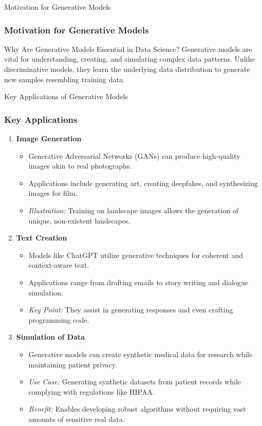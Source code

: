 \documentclass[aspectratio=169]{beamer}
\begin{document}
\begin{frame}{Motivation for Generative Models}
    \frametitle{Motivation for Generative Models}
    
    \begin{block}{Why Are Generative Models Essential in Data Science?}
        Generative models are vital for understanding, creating, and simulating complex data patterns. Unlike discriminative models, they learn the underlying data distribution to generate new samples resembling training data.
    \end{block}
\end{frame}

\begin{frame}{Key Applications of Generative Models}
    \frametitle{Key Applications}
    \begin{enumerate}
        \item \textbf{Image Generation}
        \begin{itemize}
            \item Generative Adversarial Networks (GANs) can produce high-quality images akin to real photographs.
            \item Applications include generating art, creating deepfakes, and synthesizing images for film.
            \item \textit{Illustration:} Training on landscape images allows the generation of unique, non-existent landscapes.
        \end{itemize}
        
        \item \textbf{Text Creation}
        \begin{itemize}
            \item Models like ChatGPT utilize generative techniques for coherent and context-aware text.
            \item Applications range from drafting emails to story writing and dialogue simulation.
            \item \textit{Key Point:} They assist in generating responses and even crafting programming code.
        \end{itemize}
        
        \item \textbf{Simulation of Data}
        \begin{itemize}
            \item Generative models can create synthetic medical data for research while maintaining patient privacy.
            \item \textit{Use Case:} Generating synthetic datasets from patient records while complying with regulations like HIPAA.
            \item \textit{Benefit:} Enables developing robust algorithms without requiring vast amounts of sensitive real data.
        \end{itemize}
    \end{enumerate}
\end{frame}
\end{document}
